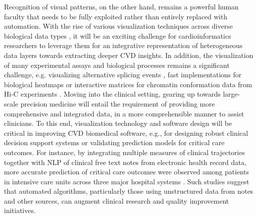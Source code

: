 \documentclass[letter]{bioinfo}
\begin{document}
	Recognition of visual patterns, on the other hand, remains a powerful human faculty that needs to be fully exploited rather than entirely replaced with automation.  With the rise of various visualization techniques across diverse biological data types \citep{Pavlopoulos:2015:Visualizing,ODonoghue:2018:Visualization}, it will be an exciting challenge for cardioinformatics researchers to leverage them for an integrative representation of heterogeneous data layers towards extracting deeper CVD insights. In addition, the visualization of many experimental assays and biological processes remains a significant challenge, e.g. visualizing alternative splicing events \citep{Katz:2015:Quantitative,Strobelt:2016:Vials}, fast implementations for biological heatmaps \citep{Khomtchouk:2017:shinyheatmap} or interactive matrices for chromatin conformation data from Hi-C experiments \citep{Kerpedjiev:2018:HiGlass,Lekschas:2018:HiPiler}. Moving into the clinical setting, gearing up towards large-scale precision medicine will entail the requirement of providing more comprehensive and integrated data, in a more comprehensible manner to assist clinicians.  To this end, visualization technology and software design will be critical in improving CVD biomedical software, e.g., for designing robust clinical decision support systems or validating prediction models for critical care outcomes.  For instance, by integrating multiple measures of clinical trajectories together with NLP of clinical free text notes from electronic health record data, more accurate prediction of critical care outcomes were observed among patients in intensive care units across three major hospital systems \citep{Marafino:2018:Validation}.  Such studies suggest that automated algorithms, particularly those using unstructured data from notes and other sources, can augment clinical research and quality improvement initiatives.

		
	
	
	
\end{document}
